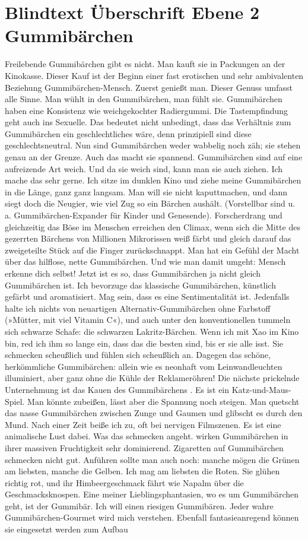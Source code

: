 \documentclass[
	ngerman,
	ruledheaders=section,%
	class=report,%
	thesis={type=bachelor},%
	accentcolor=1b,%
	custommargins=true,%
	marginpar=false,%
	parskip=half-,%
	fontsize=11pt,%
	DIV=14,
]{tudapub}
\begin{document}
\section{Blindtext Überschrift Ebene 2 Gummibärchen}
Freilebende Gummibärchen gibt es nicht. Man kauft sie in Packungen an der Kinokasse. Dieser Kauf ist der Beginn einer fast erotischen und sehr ambivalenten Beziehung Gummibärchen-Mensch. Zuerst genießt man. Dieser Genuss umfasst alle Sinne. Man wühlt in den Gummibärchen, man fühlt sie. Gummibärchen haben eine Konsistenz wie weichgekochter Radiergummi. Die Tastempfindung geht auch ins Sexuelle. Das bedeutet nicht unbedingt, dass das Verhältnis zum Gummibärchen ein geschlechtliches wäre, denn prinzipiell sind diese geschlechtsneutral. Nun sind Gummibärchen weder wabbelig noch zäh; sie stehen genau an der Grenze. Auch das macht sie spannend. Gummibärchen sind auf eine aufreizende Art weich. Und da sie weich sind, kann man sie auch ziehen. Ich mache das sehr gerne. Ich sitze im dunklen Kino und ziehe meine Gummibärchen in die Länge, ganz ganz langsam. Man will sie nicht kaputtmachen, und dann siegt doch die Neugier, wie viel Zug so ein Bärchen aushält. (Vorstellbar sind u. a. Gummibärchen-Expander für Kinder und Genesende). Forscherdrang und gleichzeitig das Böse im Menschen erreichen den Climax, wenn sich die Mitte des gezerrten Bärchens von Millionen Mikrorissen weiß färbt und gleich darauf das zweigeteilte Stück auf die Finger zurückschnappt. Man hat ein Gefühl der Macht über das hilflose, nette Gummibärchen. Und wie man damit umgeht: Mensch erkenne dich selbst! Jetzt ist es so, dass Gummibärchen ja nicht gleich Gummibärchen ist. Ich bevorzuge das klassische Gummibärchen, künstlich gefärbt und aromatisiert. Mag sein, dass es eine Sentimentalität ist. Jedenfalls halte ich nichts von neuartigen Alternativ-Gummibärchen ohne Farbstoff (»Mütter, mit viel Vitamin C«), und auch unter den konventionellen tummeln sich schwarze Schafe: die schwarzen Lakritz-Bärchen. Wenn ich mit Xao im Kino bin, red ich ihm so lange ein, dass das die besten sind, bis er sie alle isst. Sie schmecken scheußlich und fühlen sich scheußlich an. Dagegen das schöne, herkömmliche Gummibärchen: allein wie es neonhaft vom Leinwandleuchten illuminiert, aber ganz ohne die Kühle der Reklameröhren! Die nächste prickelnde Unternehmung ist das Kauen des Gummibärchens \parencite{arbelaez2010contour}. Es ist ein Katz-und-Maus-Spiel. Man könnte zubeißen, lässt aber die Spannung noch steigen. Man quetscht das nasse Gummibärchen zwischen Zunge und Gaumen und glibscht es durch den Mund. Nach einer Zeit beiße ich zu, oft bei nervigen Filmszenen. Es ist eine animalische Lust dabei. Was das schmecken angeht. wirken Gummibärchen in ihrer massiven Fruchtigkeit sehr dominierend. Zigaretten auf Gummibärchen schmecken nicht gut. Anführen sollte man auch noch: manche mögen die Grünen am liebsten, manche die Gelben. Ich mag am liebsten die Roten. Sie glühen richtig rot, und ihr Himbeergeschmack fährt wie Napalm über die Geschmacksknospen. Eine meiner Lieblingsphantasien, wo es um Gummibärchen geht, ist der Gummibär. Ich will einen riesigen Gummibären. Jeder wahre Gummibärchen-Gourmet wird mich verstehen. Ebenfall fantasieanregend können sie eingesetzt werden zum Aufbau 
\end{document}
